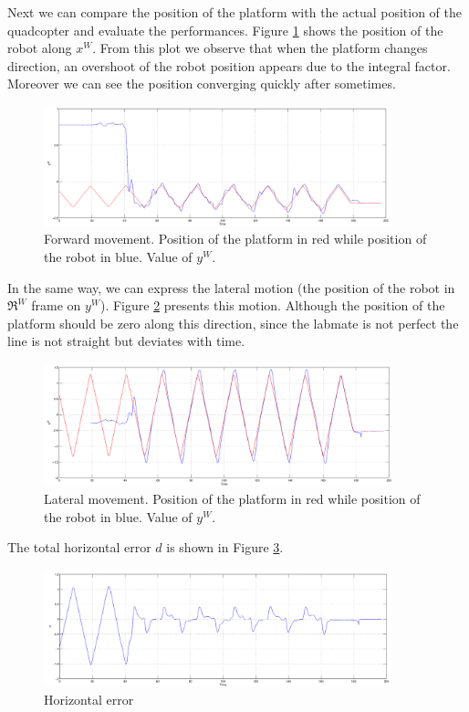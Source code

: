 \noindent
Next we can compare the position of the platform with the actual position of the quadcopter and evaluate the performances. Figure \ref{figure:forward} shows the position of the robot along $x^W$. From this plot we observe that when the platform changes direction, an overshoot of the robot position appears due to the integral factor. Moreover we can see the position converging quickly after sometimes. 
 
   \begin{figure}[h]
    \centering
      \includegraphics[width = 0.9\textwidth ]{wy.png}
       \caption[Lateral movement]{Forward movement. Position of the platform in red while position of the robot in blue. Value of $y^W$.}
      \label{figure:forward}
   \end{figure}
   
\noindent
In the same way, we can express the lateral motion (the position of the robot in $\Re^W$ frame on $y^W$). Figure \ref{figure:lateral} presents this motion. Although the position of the platform should be zero along this direction, since the labmate is not perfect the line is not straight but deviates with time.
  \begin{figure}[H]
    \centering
      \includegraphics[width = 0.9\textwidth ]{wx.png}
       \caption[Lateral movement]{Lateral movement. Position of the platform in red while position of the robot in blue. Value of $y^W$.}
      \label{figure:lateral}
   \end{figure}
   
\noindent
The total horizontal error $d$ is shown in Figure \ref{figure:err}.
\begin{figure}[h]
    \centering
      \includegraphics[width = 0.9\textwidth]{d.png}
       \caption{Horizontal error }
      \label{figure:err}
\end{figure}

